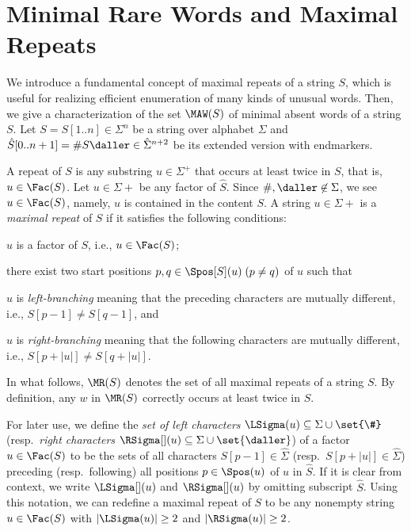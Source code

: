\section{Minimal Rare Words and Maximal Repeats}
\label{sec:mrep}

We introduce a fundamental concept of maximal repeats of a string $S$, which is useful for realizing efficient enumeration of many kinds of unusual words. Then, we give a characterization of the set $\MAW(S)$ of minimal absent words of a string $S$. 
Let $S = S[1..n] \in \Sigma^n$ be a string over alphabet $\Sigma$ and $\hat S[0..n+1] = \# S\daller \in \hat\Sigma^{n+2}$ be its extended version with endmarkers.

A repeat of $S$ is any substring $u \in \Sigma^+$ that occurs at least twice in $S$, that is, $u \in \Fac(S)$.
Let $u \in \Sigma+$ be any factor of $\hat S$. Since $\#, \daller \not\in \Sigma$, we see $u \in \Fac(S)$, namely, $u$ is contained in the content $S$.
A string $u \in \Sigma+$ is a \textit{maximal repeat} of $S$ if it satisfies the following conditions: 
\begin{enumerate*}[(1)]
\item $u$ is a factor of $S$, i.e., $u \in \Fac(S)$;  
\item there exist two start positions $p, q \in \Spos[S](u)\;(p\not= q)$ of $u$ such that
  \begin{enumerate*}[(i)]
  \item $u$ is \textit{left-branching} meaning that the preceding characters are mutually different, i.e., $S[p-1] \not= S[q-1]$, and
  \item $u$ is \textit{right-branching} meaning that the following characters are mutually different, i.e., $S[p+|u|] \not= S[q+|u|]$. 
  \end{enumerate*}
\end{enumerate*}
In what follows, $\MR(S)$ denotes the set of all maximal repeats of a string $S$. By definition, any $w$ in $\MR(S)$ correctly occurs at least twice in $S$. 

For later use, we define the \textit{set of left characters} $\LSigma(u) \subseteq \Sigma\cup\set{\#}$ (resp.~\textit{right characters} $\RSigma[](u) \subseteq \Sigma\cup\set{\daller}$) of a factor $u \in \Fac(S)$ to be the sets of all characters $S[p-1] \in \hat\Sigma$ (resp.~$S[p+|u|] \in \hat\Sigma$) preceding (resp.~following) all positions $p\in \Spos(u)$ of $u$ in $\hat S$.
If it is clear from context, we write $\LSigma[](u)$ and $\RSigma[](u)$ by omitting subscript $\hat S$. 
Using this notation, we can redefine a maximal repeat of $S$ to be any nonempty string $u \in \Fac(S)$ with $|\LSigma(u)| \ge 2$ and $|\RSigma(u)| \ge 2$.


